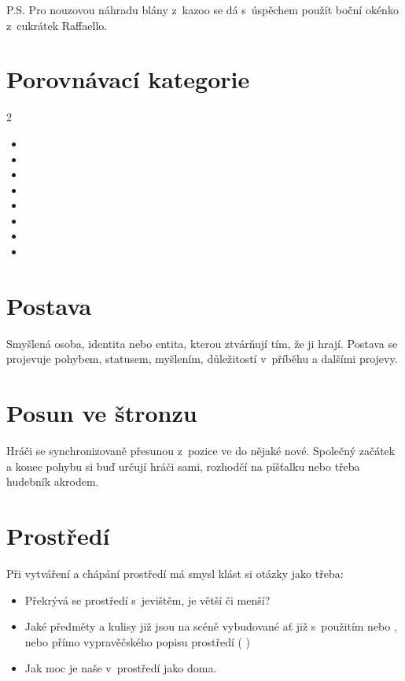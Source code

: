  
P.S. Pro nouzovou náhradu blány z~kazoo se dá s~úspěchem použít boční okénko z~cukrátek Raffaello. 
 
 
\needspace{5cm} \section{Porovnávací kategorie} \label{porovnávací kategorie} \label{:kategorie:porovnávací kategorie} 
\begin{multicols}{2}\begin{itemize} 
\item  {}  
\item  {}  
\item  {}  
\item  {}  
\item  {}  
\item  {}  
\item  {}  
\item  {}  
\end{itemize} 
\end{multicols} 
\needspace{5cm} \section{Postava} \label{postava} Smyšlená osoba, identita nebo entita, kterou ztvárňují  tím, že ji hrají. Postava se projevuje pohybem, statusem, myšlením, důležitostí v~příběhu a dalšími projevy. 
 
 
\needspace{5cm} \section{Posun ve štronzu} \label{posun ve štronzu} Hráči se synchronizovaně přesunou z~pozice ve  do nějaké nové.  Společný začátek a konec pohybu si buď určují hráči sami, rozhodčí na píšťalku nebo třeba hudebník akrodem. 
 
 
\needspace{5cm} \section{Prostředí} \label{prostředí} Při vytváření a chápání prostředí má smysl klást si otázky jako třeba: 
\begin{itemize}
\item  Překrývá se prostředí s~jevištěm, je větší či menší?
\item  Jaké předměty a kulisy již jsou na scéně vybudované ať již s~použitím  nebo , nebo přímo vypravěčského popisu  prostředí ( )
\item  Jak moc je naše  v~prostředí jako doma.
\end{itemize}
 
